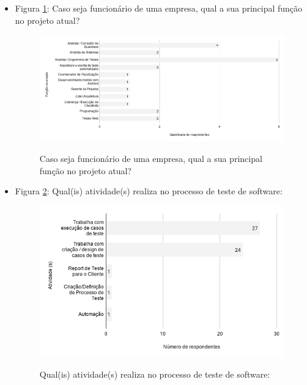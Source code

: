 \begin{itemize}
    \item Figura \ref{figure:s_funcaoprojeto}: Caso seja funcionário de uma empresa, qual a sua principal função no projeto atual?
    \begin{figure}[!htb]
    \centering
    \includegraphics[width=.80\textwidth]{images/s_funcaoprojeto.png}
    \label{figure:s_funcaoprojeto}
    \caption{Caso seja funcionário de uma empresa, qual a sua principal função no projeto atual?}
    \end{figure}
    
    
    \item Figura \ref{figure:s_atividadesprojeto}: Qual(is) atividade(s) realiza no processo de teste de software:
    \begin{figure}[!htb]
    \centering
    \includegraphics[width=.80\textwidth]{images/s_atividadesprojeto.png}
    \label{figure:s_atividadesprojeto}
    \caption{Qual(is) atividade(s) realiza no processo de teste de software:}
    \end{figure}   
    

\end{itemize}
